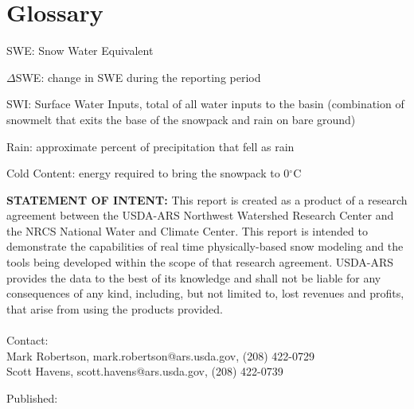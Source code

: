 \documentclass[11pt, oneside]{article}
\begin{document}
\clearpage



\clearpage



\clearpage



\clearpage
\section*{Glossary}

\begin{itemize}
	\setlength\itemsep{0.05em}
	\footnotesize{
		\item[] SWE: Snow Water Equivalent
		\item[] $\Delta$SWE: change in SWE during the reporting period
		\item[] SWI: Surface Water Inputs, total of all water inputs to the basin (combination of snowmelt that exits the base of the snowpack and rain on bare ground)
		\item[] Rain: approximate percent of precipitation that fell as rain
		\item[] Cold Content: energy required to bring the snowpack to 0$^{\circ}$C
	}
\end{itemize}

\vspace{1cm}

\noindent\textbf{STATEMENT OF INTENT:} This report is created as a product of a research agreement between the USDA-ARS Northwest Watershed Research Center and the NRCS National Water and Climate Center. This report is intended to demonstrate the capabilities of real time physically-based snow modeling and the tools being developed within the scope of that research agreement. USDA-ARS provides the data to the best of its knowledge and shall not be liable for any consequences of any kind, including, but not limited to, lost revenues and profits, that arise from using the products provided. \\
\vspace{1cm}  \\
\noindent
Contact: \\
\hspace{2cm} Mark Robertson, mark.robertson@ars.usda.gov, (208) 422-0729 \\
\hspace{2cm} Scott Havens, scott.havens@ars.usda.gov, (208) 422-0739 \\

\par\vspace*{\fill}
\noindent
\footnotesize{
Published: 
}
\end{document}
